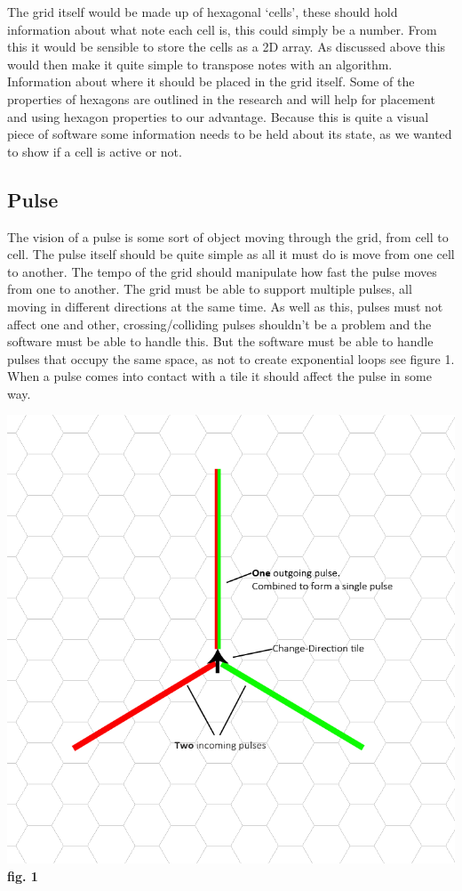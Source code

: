 \documentclass[10pt,a4paper]{article}
\begin{document}
The grid itself would be made up of hexagonal `cells’, these should hold information about what note each cell is, this could simply be a number. From this it would be sensible to store the cells as a 2D array. As discussed above this would then make it quite simple to transpose notes with an algorithm. Information about where it should be placed in the grid itself. Some of the properties of hexagons are outlined in the research and will help for placement and using hexagon properties to our advantage. Because this is quite a visual piece of software some information needs to be held about its state, as we wanted to show if a cell is active or not.

\subsection{Pulse}
The vision of a pulse is some sort of object moving through the grid, from cell to cell. The pulse itself should be quite simple as all it must do is move from one cell to another. The tempo of the grid should manipulate how fast the pulse moves from one to another. The grid must be able to support multiple pulses, all moving in different directions at the same time. As well as this, pulses must not affect one and other, crossing/colliding pulses shouldn't be a problem and the software must be able to handle this. But the software must be able to handle pulses that occupy the same space, as not to create exponential loops see figure 1. When a pulse comes into contact with a tile it should affect the pulse in some way.
\begin{center}
\includegraphics[scale=0.5]{6.png}
\textbf{fig. 1}
\end{center}
\end{document}
